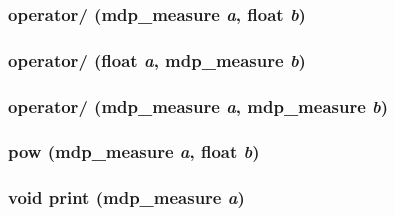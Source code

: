 \hypertarget{classmdp__measure_ae62ef8561fd82d07834885f6c7569a23}{
\subsubsection[{operator/}]{ operator/ ({\bf mdp\_\-measure} {\em a}, \/  float {\em b})}}
\label{classmdp__measure_ae62ef8561fd82d07834885f6c7569a23}
\hypertarget{classmdp__measure_acac38148dfa66a6b1c40a18896778bbb}{
\subsubsection[{operator/}]{ operator/ (float {\em a}, \/  {\bf mdp\_\-measure} {\em b})}}
\label{classmdp__measure_acac38148dfa66a6b1c40a18896778bbb}
\hypertarget{classmdp__measure_a662fb1d8c18de9dc82182a67a082f24d}{
\subsubsection[{operator/}]{ operator/ ({\bf mdp\_\-measure} {\em a}, \/  {\bf mdp\_\-measure} {\em b})}}
\label{classmdp__measure_a662fb1d8c18de9dc82182a67a082f24d}
\hypertarget{classmdp__measure_adcca585e0856bb912b8069aaf56f9d95}{
\subsubsection[{pow}]{ pow ({\bf mdp\_\-measure} {\em a}, \/  float {\em b})}}
\label{classmdp__measure_adcca585e0856bb912b8069aaf56f9d95}
\hypertarget{classmdp__measure_a2974468f862cb8c3fe0a0034a4bd2e08}{
\subsubsection[{print}]{\setlength{\rightskip}{0pt plus 5cm}void print ({\bf mdp\_\-measure} {\em a})}}

